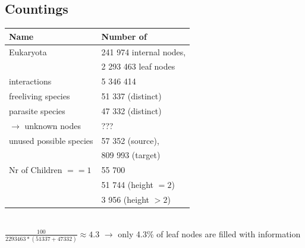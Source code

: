     \subsection{Countings}
      \begin{center}
        \begin{tabular}{ | l | l | }
          \hline
          Name & Number of \\
          \hline \hline
          Eukaryota & 241 974 internal nodes, \\
          & 2 293 463 leaf nodes \\ \hline
          interactions & 5 346 414 \\ \hline
          freeliving species & 51 337 (distinct) \\ \hline
          parasite species &  47 332 (distinct) \\ \hline
          $\rightarrow$ unknown nodes & ??? \\ \hline
          unused possible species & 57 352 (source), \\
          & 809 993 (target) \\
          \hline
          Nr of Children $== 1$ & 55 700 \\
          & 51 744 (height $=2$) \\
          & 3 956 (height $>2$) \\ \hline
        \end{tabular}
      \end{center}
       \\
      $\frac{100}{2293463 * (51337 + 47332)} \approx 4.3$ $\rightarrow$ only 4.3\% of leaf nodes are 
        filled with information

